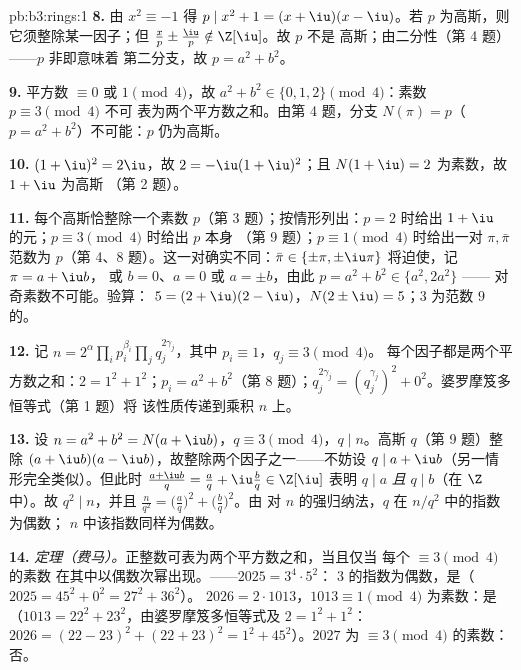 \begin{solution}{pb:b3:rings:1}
\textbf{8.} 由 $x^2 \equiv -1$ 得 $p \mid x^2 + 1 = (x + \iu)(x -
\iu)$。若 $p$ 为高斯，则它须整除某一因子；但
$\frac xp \pm \frac \iu p \notin \Z[\iu]$。故 $p$ 不是
高斯；由二分性（第 4 题）——$p$ 非即意味着
第二分支，故 $p = a^2 + b^2$。

\textbf{9.} 平方数 $\equiv 0$ 或 $1 \pmod 4$，故 $a^2 + b^2
\in \{0, 1, 2\} \pmod 4$：素数 $p \equiv 3 \pmod 4$ 不可
表为两个平方数之和。由第 4 题，分支 $N(\pi) = p$（$p =
a^2+b^2$）不可能：$p$ 仍为高斯。

\textbf{10.} $(1 + \iu)^2 = 2\iu$，故 $2 = -\iu(1 + \iu)^2$；且
$N(1 + \iu) = 2$ 为素数，故 $1 + \iu$ 为高斯
（第 2 题）。

\textbf{11.} 每个高斯恰整除一个素数
$p$（第 3 题）；按情形列出：$p = 2$ 时给出
$1 + \iu$ 的元；$p \equiv 3 \pmod 4$ 时给出 $p$ 本身
（第 9 题）；$p \equiv 1 \pmod 4$ 时给出一对 $\pi, \bar\pi$
范数为 $p$（第 4、8 题）。这一对确实不同：$\bar\pi \in
\{\pm\pi, \pm\iu\pi\}$ 将迫使，记 $\pi = a + \iu b$，
或 $b = 0$、$a = 0$ 或 $a = \pm b$，由此 $p = a^2 + b^2 \in
\{a^2, 2a^2\}$ —— 对奇素数不可能。验算：
$5 = (2 + \iu)(2 - \iu)$，$N(2\pm\iu) = 5$；$3$ 为范数
$9$ 的。

\textbf{12.} 记 $n = 2^{\alpha}\prod_i p_i^{\beta_i} \prod_j
q_j^{2\gamma_j}$，其中 $p_i \equiv 1$，$q_j \equiv 3 \pmod 4$。
每个因子都是两个平方数之和：$2 = 1^2 + 1^2$；$p_i = a^2
+ b^2$（第 8 题）；$q_j^{2\gamma_j} = (q_j^{\gamma_j})^2 +
0^2$。婆罗摩笈多恒等式（第 1 题）将
该性质传递到乘积 $n$ 上。

\textbf{13.} 设 $n = a^2 + b^2 = N(a + \iu b)$，$q \equiv 3
\pmod 4$，$q \mid n$。高斯 $q$（第 9 题）整除
$(a + \iu b)(a - \iu b)$，故整除两个因子之一——不妨设 $q
\mid a + \iu b$（另一情形完全类似）。但此时 $\frac{a +
\iu b}{q} = \frac aq + \iu \frac bq \in \Z[\iu]$ 表明 $q
\mid a$ \emph{且} $q \mid b$（在 $\Z$ 中）。故 $q^2 \mid n$，并且
$\frac n{q^2} =
\bigl(\frac aq\bigr)^2 + \bigl(\frac bq\bigr)^2$。由
对 $n$ 的强归纳法，$q$ 在 $n/q^2$ 中的指数为偶数；
$n$ 中该指数同样为偶数。

\textbf{14.} \emph{定理（费马）。}正整数可表为两个平方数之和，当且仅当
每个 $\equiv 3 \pmod 4$ 的素数
在其中以偶数次幂出现。——$2025 = 3^4 \cdot 5^2$：
$3$ 的指数为偶数，是（$2025 = 45^2 + 0^2 = 27^2 + 36^2$）。
$2026 = 2 \cdot 1013$，$1013 \equiv 1 \pmod 4$ 为素数：是
（$1013 = 22^2 + 23^2$，由婆罗摩笈多恒等式及 $2 = 1^2+1^2$：
$2026 = (22 - 23)^2 + (22 + 23)^2 = 1^2 + 45^2$）。$2027$ 为
$\equiv 3 \pmod 4$ 的素数：否。


\end{solution}
